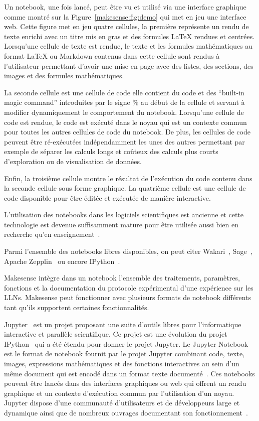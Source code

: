 Un notebook, une fois lancé, peut être vu et utilisé via une interface graphique comme montré sur la Figure~\ref{makesense:fig:demo} qui met en jeu une interface web.
Cette figure met en jeu quatre cellules, la première représente un rendu de texte enrichi avec un titre mis en gras et des formules \LaTeX{} rendues et centrées.
Lorsqu'une cellule de texte est rendue, le texte et les formules mathématiques au format \LaTeX{} ou Markdown contenus  dans cette cellule sont rendus à l'utilisateur permettant d'avoir une mise en page avec des listes, des sections, des images et des formules mathématiques.

La seconde cellule est une cellule de code elle contient du code et des ``built-in magic command'' introduites par le signe \% au début de la cellule et servant à modifier dynamiquement le comportement du notebook.
Lorsqu'une cellule de code est rendue, le code est exécuté dans le noyau qui est un contexte commun pour toutes les autres cellules de code du notebook.
De plus, les cellules de code peuvent être ré-exécutées indépendamment les unes des autres permettant par exemple de séparer les calculs longs et coûteux des calculs plus courts d'exploration ou de visualisation de données.

Enfin, la troisième cellule montre le résultat de l'exécution du code contenu dans la seconde cellule sous forme graphique.
La quatrième cellule est une cellule de code disponible pour être éditée et exécutée de manière interactive.

L'utilisation des notebooks dans les logiciels scientifiques est ancienne et cette technologie est devenue suffisamment mature pour être utilisée aussi bien en recherche qu'en enseignement~\cite{gray1991exploring,young2003science,stevens2013automated,perez2013open}.

Parmi l'ensemble des notebooks libres disponibles, on peut citer Wakari~\cite{tsaftaris2014scientist}, Sage~\cite{stein2008sage}, Apache Zepplin~\cite{manivannan2015scala} ou encore IPython~\cite{PER-GRA:2007}.

Makesense intègre dans un notebook l'ensemble des traitements, paramètres, fonctions et la documentation du protocole expérimental d'une expérience sur les \ac{LLN}s.
Makesense peut fonctionner avec plusieurs formats de notebook différents tant qu'ils supportent certaines fonctionnalités.

Jupyter~\cite{poweredbyjupyter} est un projet proposant une suite d'outils libres pour l'informatique interactive et parallèle scientifique.
Ce projet est une évolution du projet IPython~\cite{PER-GRA:2007} qui a été étendu pour donner le projet Jupyter.
Le Jupyter Notebook est le format de notebook fournit par le projet Jupyter combinant code, texte, images, expressions mathématiques et des fonctions interactives au sein d'un même document qui est encodé dans un format texte documenté~\cite{notebookformat}.
Ces notebooks peuvent être lancés dans des interfaces graphiques ou web qui offrent un rendu graphique et un contexte d'exécution commun par l'utilisation d'un noyau.
Jupyter dispose d'une communauté d'utilisateurs et de développeurs large et dynamique ainsi que de nombreux ouvrages documentant son fonctionnement~\cite{mckinney2012python}.

